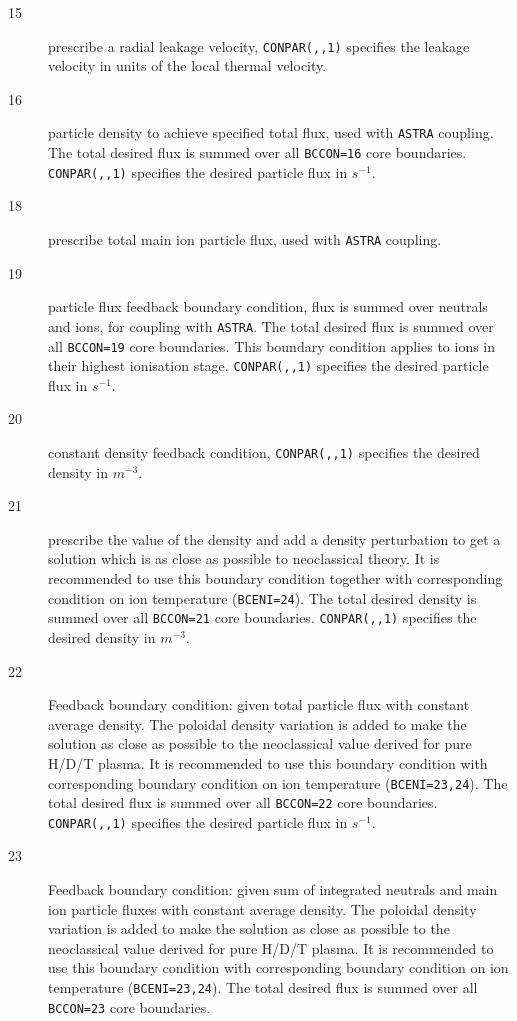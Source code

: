 \documentclass[a4paper,10pt]{report}
\begin{document}
\begin{description}
\begin{description}
  \item[15] prescribe a radial leakage velocity,
  {\tt CONPAR(,,1)} specifies the leakage velocity in units of the local thermal velocity.
  \item[16] particle density to achieve specified total flux, used with {\tt ASTRA} coupling. The total desired flux is summed over all {\tt BCCON=16} core boundaries.
  {\tt CONPAR(,,1)} specifies the desired particle flux in $s^{-1}$.
  \item[18] prescribe total main ion particle flux, used with {\tt ASTRA} coupling.
  \item[19] particle flux feedback boundary condition, flux is summed over neutrals and ions, for coupling with {\tt ASTRA}. The total desired flux is summed over all {\tt BCCON=19} core boundaries. This boundary condition applies to ions in their highest ionisation stage.
  {\tt CONPAR(,,1)} specifies the desired particle flux in $s^{-1}$.
  \item[20] constant density feedback condition,
  {\tt CONPAR(,,1)} specifies the desired density in $m^{-3}$.
  \item[21] prescribe the value of the density and add a density perturbation to get a solution which is as close as possible to neoclassical theory. It is recommended to use this boundary condition together with corresponding condition on ion temperature ({\tt BCENI=24}). The total desired density is summed over all {\tt BCCON=21} core boundaries.
  {\tt CONPAR(,,1)} specifies the desired density in $m^{-3}$.
  \item[22] Feedback boundary condition: given total particle flux with constant average density. The poloidal density variation is added to make the solution as close as possible to the neoclassical value derived for pure H/D/T plasma. It is recommended to use this boundary condition with corresponding boundary condition on ion temperature ({\tt BCENI=23,24}). The total desired flux is summed over all {\tt BCCON=22} core boundaries.
  {\tt CONPAR(,,1)} specifies the desired particle flux in $s^{-1}$.
  \item[23] Feedback boundary condition: given sum of integrated neutrals and main ion particle fluxes with constant average density. The poloidal density variation is added to make the solution as close as possible to the neoclassical value derived for pure H/D/T plasma. It is recommended to use this boundary condition with corresponding boundary condition on ion temperature ({\tt BCENI=23,24}). The total desired flux is summed over all {\tt BCCON=23} core boundaries.

\end{description}
\end{description}
\end{document}

